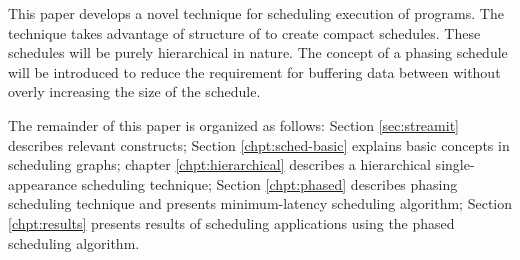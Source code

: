 This paper develops a novel technique for scheduling execution of
{\StreamIt} programs. The technique takes advantage of structure
of {\StreamIt} to create compact schedules. These schedules will
be purely hierarchical in nature. The concept of a phasing
schedule will be introduced to reduce the requirement for
buffering data between {\filters} without overly increasing the
size of the schedule.

\begin{comment}
The contributions of this thesis are:
\begin{itemize} \item
hierarchical scheduling of streaming application, a concept
enabled by {\StreamIt} language, \item first formal handling of
{\SDF} graphs with peeking, \item novel phasing scheduling
technique, \item a minimal latency schedule using hierarchical
phases, \item novel {\SDF} program abstraction called the
information buffering model that simplifies information latency
analysis, \item a solution to scheduling of {\StreamIt} programs
with latency constraints.
\end{itemize}
\end{comment}

The remainder of this paper is organized as follows: Section
\ref{sec:streamit} describes relevant {\StreamIt} constructs;
Section \ref{chpt:sched-basic} explains basic concepts in
scheduling {\StreamIt} graphs; chapter \ref{chpt:hierarchical}
describes a hierarchical single-appearance scheduling technique;
Section \ref{chpt:phased} describes phasing scheduling technique
and presents minimum-latency scheduling algorithm; Section
\ref{chpt:results} presents results of scheduling applications
using the phased scheduling algorithm.
